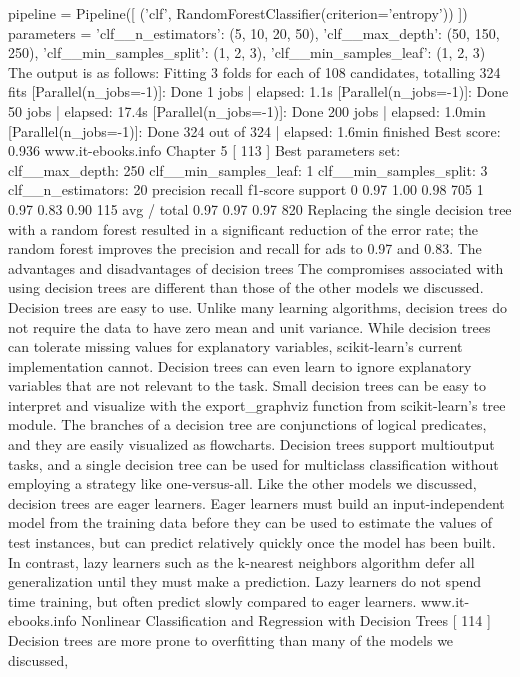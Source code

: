 pipeline = Pipeline([
('clf', RandomForestClassifier(criterion='entropy'))
])
parameters = {
	'clf__n_estimators': (5, 10, 20, 50),
	'clf__max_depth': (50, 150, 250),
	'clf__min_samples_split': (1, 2, 3),
	'clf__min_samples_leaf': (1, 2, 3)
}
The output is as follows:
Fitting 3 folds for each of 108 candidates, totalling 324 fits
[Parallel(n_jobs=-1)]: Done 1 jobs | elapsed: 1.1s
[Parallel(n_jobs=-1)]: Done 50 jobs | elapsed: 17.4s
[Parallel(n_jobs=-1)]: Done 200 jobs | elapsed: 1.0min
[Parallel(n_jobs=-1)]: Done 324 out of 324 | elapsed: 1.6min finished
Best score: 0.936
www.it-ebooks.info
Chapter 5
[ 113 ]
Best parameters set:
clf__max_depth: 250
clf__min_samples_leaf: 1
clf__min_samples_split: 3
clf__n_estimators: 20
precision recall f1-score support
0 0.97 1.00 0.98 705
1 0.97 0.83 0.90 115
avg / total 0.97 0.97 0.97 820
Replacing the single decision tree with a random forest resulted in a significant
reduction of the error rate; the random forest improves the precision and recall for
ads to 0.97 and 0.83.
The advantages and disadvantages of
decision trees
The compromises associated with using decision trees are different than those of
the other models we discussed. Decision trees are easy to use. Unlike many learning
algorithms, decision trees do not require the data to have zero mean and unit
variance. While decision trees can tolerate missing values for explanatory variables,
scikit-learn's current implementation cannot. Decision trees can even learn to ignore
explanatory variables that are not relevant to the task.
Small decision trees can be easy to interpret and visualize with the export_graphviz
function from scikit-learn's tree module. The branches of a decision tree are
conjunctions of logical predicates, and they are easily visualized as flowcharts.
Decision trees support multioutput tasks, and a single decision tree can be used for
multiclass classification without employing a strategy like one-versus-all.
Like the other models we discussed, decision trees are eager learners. Eager learners
must build an input-independent model from the training data before they can be
used to estimate the values of test instances, but can predict relatively quickly once
the model has been built. In contrast, lazy learners such as the k-nearest neighbors
algorithm defer all generalization until they must make a prediction. Lazy learners
do not spend time training, but often predict slowly compared to eager learners.
www.it-ebooks.info
Nonlinear Classification and Regression with Decision Trees
[ 114 ]
Decision trees are more prone to overfitting than many of the models we discussed,
